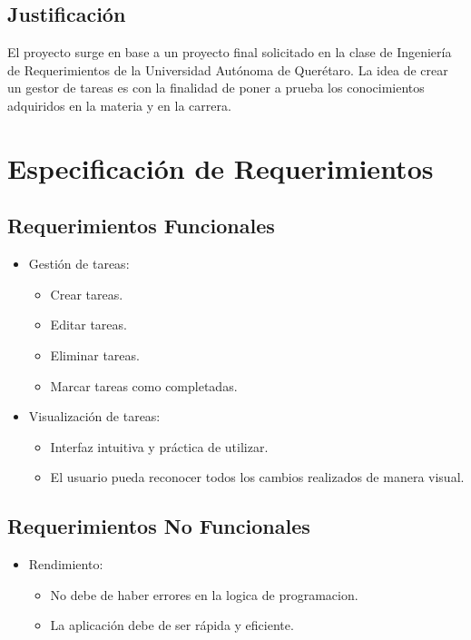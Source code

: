 \documentclass[a4paper, 12pt]{report}
\begin{document}
	
	\section{Justificación}
	El proyecto surge en base a un proyecto final solicitado en la clase de Ingeniería de Requerimientos
    de la Universidad Autónoma de Querétaro. La idea de crear un gestor de tareas es con la finalidad de poner 
    a prueba los conocimientos adquiridos en la materia y en la carrera.
	
	\chapter{Especificación de Requerimientos}
	\section{Requerimientos Funcionales}
    \begin{itemize}
        \item Gestión de tareas:
        \begin{itemize}
            \item Crear tareas.
            \item Editar tareas.
            \item Eliminar tareas.
            \item Marcar tareas como completadas.
        \end{itemize}
        \item Visualización de tareas:
        \begin{itemize}
            \item Interfaz intuitiva y práctica de utilizar.
            \item El usuario pueda reconocer todos los cambios realizados de manera visual.
        \end{itemize}
    \end{itemize}
	
	\section{Requerimientos No Funcionales}
	\begin{itemize}
        \item Rendimiento:
        \begin{itemize}
            \item No debe de haber errores en la logica de programacion.
            \item La aplicación debe de ser rápida y eficiente.
        \end{itemize}
    \end{itemize}
	
\end{document}
